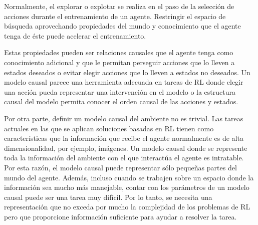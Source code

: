 Normalmente, el explorar o explotar se realiza en el 
paso de la selección de acciones durante el entrenamiento de un agente. Restringir el espacio de búsqueda aprovechando 
propiedades del mundo y conocimiento que el agente tenga
de éste puede acelerar el entrenamiento.

Estas propiedades pueden ser relaciones causales 
que el agente tenga como conocimiento adicional
y que le permitan perseguir acciones que lo lleven a
estados deseados o evitar elegir acciones que lo lleven a 
estados no deseados. Un modelo causal parece una herramienta adecuada en
tareas de RL donde elegir una acción pueda representar una intervención en el modelo o la estructura causal del modelo permita conocer el orden causal de las acciones y estados.

Por otra parte, definir un modelo causal del ambiente no es trivial.
Las tareas actuales en las que se aplican soluciones 
basadas en RL tienen como características que la información
que recibe el agente normalmente es de alta dimensionalidad, por 
ejemplo, imágenes. Un modelo causal donde se represente toda
la información del ambiente con el que interactúa el agente
es intratable. 
Por esta razón, el modelo causal puede representar sólo pequeñas partes del mundo del agente. Además, incluso cuando se trabajen sobre un espacio donde la información sea 
mucho más manejable, contar con los parámetros de un modelo causal puede ser una tarea muy difícil. Por lo tanto, se necesita una representación que no exceda por mucho la complejidad de los problemas de RL pero que proporcione información suficiente para ayudar a resolver la tarea.







